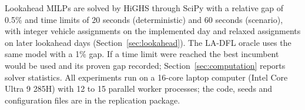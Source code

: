 Lookahead MILPs are solved by HiGHS \citep{huangfu2018parallelizing} through SciPy with a relative gap of 0.5\% and time limits of 20 seconds (deterministic) and 60 seconds (scenario), with integer vehicle assignments on the implemented day and relaxed assignments on later lookahead days (Section~\ref{sec:lookahead}). The LA-DFL oracle uses the same model with a 1\% gap. If a time limit were reached the best incumbent would be used and its proven gap recorded; Section~\ref{sec:computation} reports solver statistics. All experiments run on a 16-core laptop computer (Intel Core Ultra 9 285H) with 12 to 15 parallel worker processes; the code, seeds and configuration files are in the replication package.
